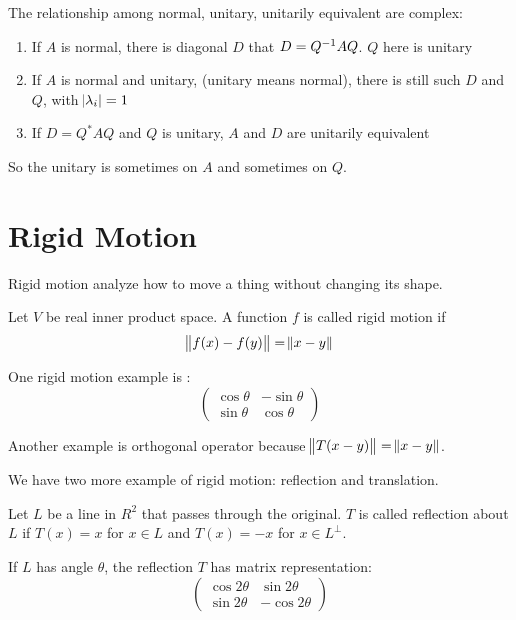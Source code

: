 The relationship among normal, unitary, unitarily equivalent are complex:
\begin{enumerate}
    \item If $A$ is normal, there is diagonal $D$ that $D = {Q}^{-1} A Q$. $Q$ here is unitary
    \item If $A$ is normal and unitary, (unitary means normal), there is still such $D$ and $Q$, with $\abs{\lambda_i} = 1$
    \item If $D = Q^* A Q$ and $Q$ is unitary, $A$ and $D$ are unitarily equivalent
\end{enumerate}

So the unitary is sometimes on $A$ and sometimes on $Q$.


\section{Rigid Motion}

Rigid motion analyze how to move a thing without changing its shape.

\begin{definition}
    Let $V$ be real inner product space. A function $f$ is called rigid motion if 
    \begin{equation}
        \norm{f(x) - f(y)} = \norm{x - y}
    \end{equation}
\end{definition}

One rigid motion example is :
\begin{equation}
    \begin{pmatrix}
        \cos \theta & - \sin \theta \\
        \sin \theta & \cos \theta
    \end{pmatrix}
\end{equation}

Another example is orthogonal operator because $\norm{T(x-y)} = \norm{x - y}$.


We have two more example of rigid motion: reflection and translation.

\begin{definition}
    Let $L$ be a line in $R^2$ that passes through the original. $T$ is called reflection about $L$ if $T(x) = x$ for $x \in L$ and $T(x) = -x$ for $x \in L^\perp$. 
    
    If $L$ has angle $\theta$, the reflection $T$ has matrix representation:
\begin{equation}
    \begin{pmatrix}
        \cos 2\theta & \sin 2\theta \\
        \sin 2\theta & -\cos 2\theta
    \end{pmatrix}
\end{equation}
\end{definition}

